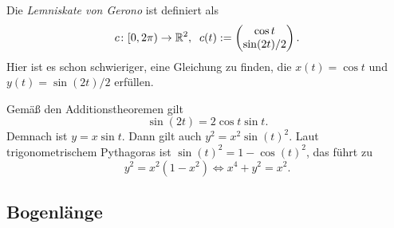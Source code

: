 Die \emph{Lemniskate von Gerono} ist definiert als
\[c\colon{[0,2\pi)}\to\mathbb R^2,\;\;c(t):=\begin{pmatrix}
\cos t\\
\sin(2t)/2
\end{pmatrix}.\]
Hier ist es schon schwieriger, eine Gleichung zu finden, die
$x(t)=\cos t$ und $y(t)=\sin(2t)/2$ erfüllen.

Gemäß den Additionstheoremen gilt
\[\sin(2t) = 2\cos t\sin t.\]
Demnach ist $y=x\sin t$. Dann gilt auch $y^2=x^2\sin(t)^2$.
Laut trigonometrischem Pythagoras ist $\sin(t)^2=1-\cos(t)^2$,
das führt zu
\begin{equation}\label{eq:Gerono-implizit}
y^2=x^2(1-x^2)\iff x^4+y^2 = x^2.
\end{equation}


\subsection{Bogenlänge}

